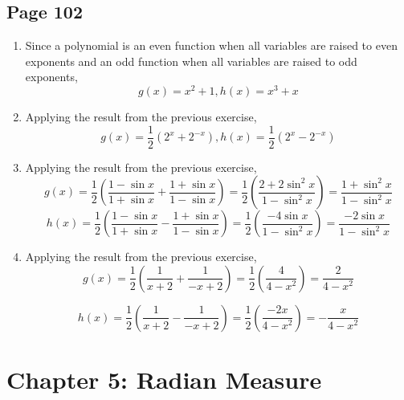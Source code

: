 \documentclass{article}
\newenvironment{solutions}[1]
{\subsection*{#1}
 \begin{enumerate}[leftmargin=1.5em]}
{\end{enumerate}}
\newenvironment{subsolutions}
{\begin{enumerate}}
{\end{enumerate}}
\newcommand{\subsolution}{\item}
\begin{document}
\begin{solutions}{Page 102}
\begin{subsolutions}
\subsolution %
Since a polynomial is an even function when all variables are raised to even exponents and an odd function when all variables are raised to odd exponents,
\[
g\left(x\right)=x^{2}+1, h\left(x\right)=x^{3}+x
\]

\subsolution %
Applying the result from the previous exercise,
\[
g\left(x\right)=\dfrac{1}{2}\left(2^{x}+2^{-x}\right), h\left(x\right)=\dfrac{1}{2}\left(2^{x}-2^{-x}\right)
\]

\subsolution %
Applying the result from the previous exercise,
\[
g\left(x\right)=\dfrac{1}{2}\left(\dfrac{1-\sin{x}}{1+\sin{x}} + \dfrac{1+\sin{x}}{1-\sin{x}}\right) = \dfrac{1}{2}\left(\dfrac{2+2\sin^{2}{x}}{1-\sin^{2}{x}}\right) = \dfrac{1+\sin^{2}{x}}{1-\sin^{2}{x}}
\]
\[
h\left(x\right)=\dfrac{1}{2}\left(\dfrac{1-\sin{x}}{1+\sin{x}} - \dfrac{1+\sin{x}}{1-\sin{x}}\right) = \dfrac{1}{2}\left(\dfrac{-4\sin{x}}{1-\sin^{2}{x}}\right) = \dfrac{-2\sin{x}}{1-\sin^{2}{x}} 
\]

\subsolution %
Applying the result from the previous exercise,
\[
g\left(x\right)=\dfrac{1}{2}\left(\dfrac{1}{x+2} + \dfrac{1}{-x+2}\right)=\dfrac{1}{2}\left(\dfrac{4}{4-x^2}\right) = \dfrac{2}{4-x^2}
\]

\[
h\left(x\right)=\dfrac{1}{2}\left(\dfrac{1}{x+2} - \dfrac{1}{-x+2}\right)=\dfrac{1}{2}\left(\dfrac{-2x}{4-x^2}\right) = -\dfrac{x}{4-x^2}
\]

\end{subsolutions}
\end{solutions}


\section*{Chapter 5: Radian Measure}
\end{document}
